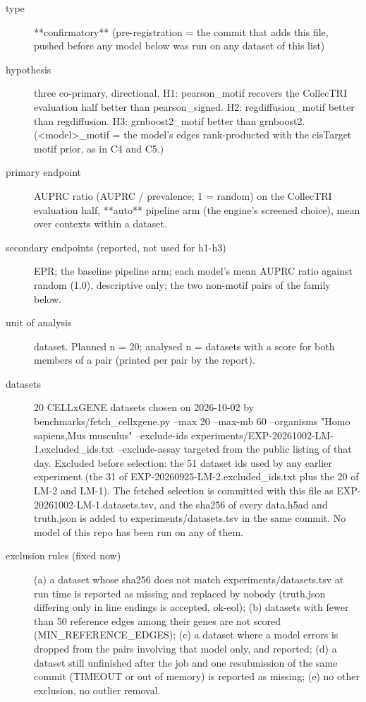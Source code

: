 \documentclass{article}
\begin{document}
\begin{description}
\item[type] **confirmatory** (pre-registration = the commit that adds this file, pushed before any model below was run on any dataset of this list)
\item[hypothesis] three co-primary, directional. H1: pearson\_motif recovers the CollecTRI evaluation half better than pearson\_signed. H2: regdiffusion\_motif better than regdiffusion. H3: grnboost2\_motif better than grnboost2. (<model>\_motif = the model's edges rank-producted with the cisTarget motif prior, as in C4 and C5.)
\item[primary endpoint] AUPRC ratio (AUPRC / prevalence; 1 = random) on the CollecTRI evaluation half, **auto** pipeline arm (the engine's screened choice), mean over contexts within a dataset.
\item[secondary endpoints (reported, not used for h1-h3)] EPR; the baseline pipeline arm; each model's mean AUPRC ratio against random (1.0), descriptive only; the two non-motif pairs of the family below.
\item[unit of analysis] dataset. Planned n = 20; analysed n = datasets with a score for both members of a pair (printed per pair by the report).
\item[datasets] 20 CELLxGENE datasets chosen on 2026-10-02 by benchmarks/fetch\_cellxgene.py --max 20 --max-mb 60 --organisms "Homo sapiens,Mus musculus" --exclude-ids experiments/EXP-20261002-LM-1.excluded\_ids.txt --exclude-assay targeted from the public listing of that day. Excluded before selection: the 51 dataset ids used by any earlier experiment (the 31 of EXP-20260925-LM-2.excluded\_ids.txt plus the 20 of LM-2 and LM-1). The fetched selection is committed with this file as EXP-20261002-LM-1.datasets.tsv, and the sha256 of every data.h5ad and truth.json is added to experiments/datasets.tsv in the same commit. No model of this repo has been run on any of them.
\item[exclusion rules (fixed now)] (a) a dataset whose sha256 does not match experiments/datasets.tsv at run time is reported as missing and replaced by nobody (truth.json differing only in line endings is accepted, ok-eol); (b) datasets with fewer than 50 reference edges among their genes are not scored (MIN\_REFERENCE\_EDGES); (c) a dataset where a model errors is dropped from the pairs involving that model only, and reported; (d) a dataset still unfinished after the job and one resubmission of the same commit (TIMEOUT or out of memory) is reported as missing; (e) no other exclusion, no outlier removal.

\end{description}
\end{document}
